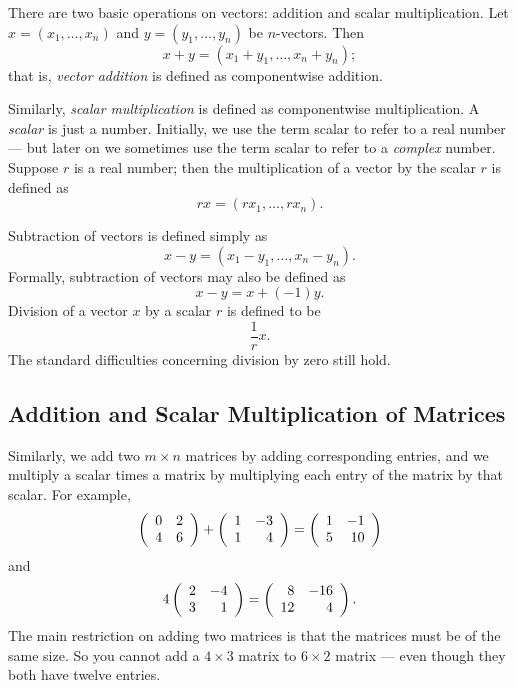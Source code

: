 \documentclass{ximera}
\begin{document}
There are two basic operations on vectors: addition and scalar
multiplication.  Let $x=(x_1,\ldots,x_n)$ and
$y=(y_1,\ldots,y_n)$ be $n$-vectors.  Then
\[
x+y=(x_1+y_1,\ldots,x_n+y_n);
\]
that is, {\em vector addition\/} is
defined as componentwise addition.

Similarly, {\em scalar multiplication\/}
is defined as
componentwise multiplication.  A {\em scalar\/} is just a
number. Initially, we use the term scalar to refer to a real
number --- but later on we sometimes use the term scalar
to refer to a {\em complex\/} number.  Suppose $r$ is a real
number; then the multiplication of a vector by the scalar $r$
is defined as
\[
rx = (rx_1,\ldots,rx_n).
\]

Subtraction of vectors is defined simply as
\[
x-y = (x_1-y_1,\ldots,x_n-y_n).
\]
Formally, subtraction of vectors may also be defined as
\[
x-y = x+(-1)y.
\]
Division of a vector $x$ by a scalar $r$ is defined to be
\[
\frac{1}{r} x.
\]
The standard difficulties concerning division by zero still hold.

\subsection*{Addition and Scalar Multiplication of Matrices}

Similarly, we add two $m\times n$ matrices
by adding corresponding
entries, and we multiply a scalar times a matrix by multiplying each
entry of the matrix by that scalar.
For example,
\[
\left(\begin{array}{rr} 0 & 2\\ 4 &6\end{array}\right) + \left(\begin{array}{rr} 1 & -3\\ 1 &4\end{array}\right) = \left(\begin{array}{rr} 1 & -1\\ 5 &10\end{array}\right)
\]
and
\[
4\left(\begin{array}{rr} 2 & -4\\ 3 &1\end{array}\right) = \left(\begin{array}{rr} 8 & -16\\ 12 &4\end{array}\right).
\]
The main restriction on adding two matrices is that the matrices must
be of the same size.  So you cannot add a $4\times 3$ matrix to $6\times 2$
matrix --- even though they both have twelve entries.



\EXER

\end{document}
